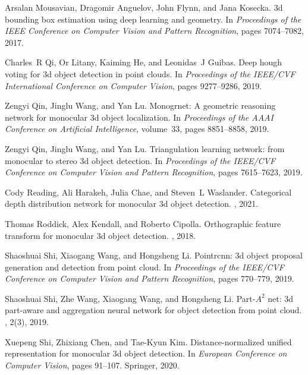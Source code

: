 \documentclass[10pt,twocolumn,letterpaper]{article}
\begin{document}
{\begin{thebibliography}{10}
Arsalan Mousavian, Dragomir Anguelov, John Flynn, and Jana Kosecka.
\newblock 3d bounding box estimation using deep learning and geometry.
\newblock In {\em Proceedings of the IEEE Conference on Computer Vision and
  Pattern Recognition}, pages 7074--7082, 2017.

Charles~R Qi, Or Litany, Kaiming He, and Leonidas~J Guibas.
\newblock Deep hough voting for 3d object detection in point clouds.
\newblock In {\em Proceedings of the IEEE/CVF International Conference on
  Computer Vision}, pages 9277--9286, 2019.

Zengyi Qin, Jinglu Wang, and Yan Lu.
\newblock Monogrnet: A geometric reasoning network for monocular 3d object
  localization.
\newblock In {\em Proceedings of the AAAI Conference on Artificial
  Intelligence}, volume~33, pages 8851--8858, 2019.

Zengyi Qin, Jinglu Wang, and Yan Lu.
\newblock Triangulation learning network: from monocular to stereo 3d object
  detection.
\newblock In {\em Proceedings of the IEEE/CVF Conference on Computer Vision and
  Pattern Recognition}, pages 7615--7623, 2019.

Cody Reading, Ali Harakeh, Julia Chae, and Steven~L Waslander.
\newblock Categorical depth distribution network for monocular 3d object
  detection.
, 2021.

Thomas Roddick, Alex Kendall, and Roberto Cipolla.
\newblock Orthographic feature transform for monocular 3d object detection.
, 2018.

Shaoshuai Shi, Xiaogang Wang, and Hongsheng Li.
\newblock Pointrcnn: 3d object proposal generation and detection from point
  cloud.
\newblock In {\em Proceedings of the IEEE/CVF Conference on Computer Vision and
  Pattern Recognition}, pages 770--779, 2019.

Shaoshuai Shi, Zhe Wang, Xiaogang Wang, and Hongsheng Li.
\newblock Part-$A^2$ net: 3d part-aware and aggregation neural network for
  object detection from point cloud.
, 2(3), 2019.

Xuepeng Shi, Zhixiang Chen, and Tae-Kyun Kim.
\newblock Distance-normalized unified representation for monocular 3d object
  detection.
\newblock In {\em European Conference on Computer Vision}, pages 91--107.
  Springer, 2020.


\end{thebibliography}}
\end{document}
